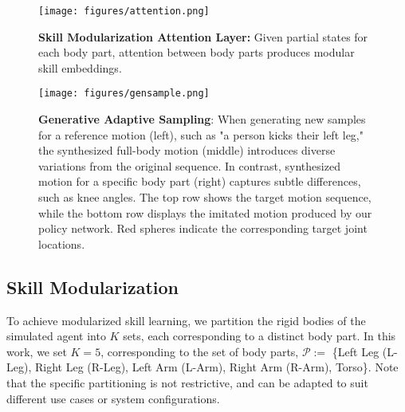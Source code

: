 \begin{figure}[t]
    \centering
    \texttt{[image: figures/attention.png]}
    \vspace{-0.5cm}
    \caption{\textbf{Skill Modularization Attention Layer:} Given partial states for each body part, attention between body parts produces modular skill embeddings.}
    \label{fig:attention}
\end{figure}

\begin{figure*}[h]
    \centering
    \texttt{[image: figures/gensample.png]}
    \caption{\textbf{Generative Adaptive Sampling}: When generating new samples for a reference motion (left), such as "a person kicks their left leg," the synthesized full-body motion (middle) introduces diverse variations from the original sequence. In contrast, synthesized motion for a specific body part (right) captures subtle differences, such as knee angles. The top row shows the target motion sequence, while the bottom row displays the imitated motion produced by our policy network. Red spheres indicate the corresponding target joint locations.}
    \label{fig:gensample}
\end{figure*}

\subsection{Skill Modularization}
\label{sec:attention}

To achieve modularized skill learning, we partition the rigid bodies of the simulated agent into $ K $ sets, each corresponding to a distinct body part. In this work, we set $ K = 5 $, corresponding to the set of body parts, $\mathcal{P} := $ \{Left Leg (L-Leg), Right Leg (R-Leg), Left Arm (L-Arm), Right Arm (R-Arm), Torso\}. Note that the specific partitioning is not restrictive, and can be adapted to suit different use cases or system configurations.

